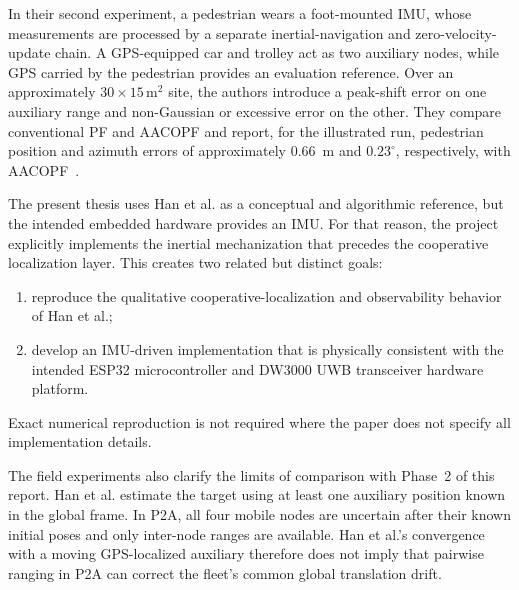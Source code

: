 In their second experiment, a pedestrian wears a foot-mounted IMU, whose measurements are processed by a separate inertial-navigation and zero-velocity-update chain. A GPS-equipped car and trolley act as two auxiliary nodes, while GPS carried by the pedestrian provides an evaluation reference. Over an approximately \(30\times15\,\mathrm{m}^2\) site, the authors introduce a peak-shift error on one auxiliary range and non-Gaussian or excessive error on the other. They compare conventional PF and AACOPF and report, for the illustrated run, pedestrian position and azimuth errors of approximately \SI{0.66}{m} and \(0.23^\circ\), respectively, with AACOPF~\cite{han2020cooperative}.

The present thesis uses Han et al. as a conceptual and algorithmic reference, but the intended embedded hardware provides an IMU. For that reason, the project explicitly implements the inertial mechanization that precedes the cooperative localization layer. This creates two related but distinct goals:
\begin{enumerate}
    \item reproduce the qualitative cooperative-localization and observability behavior of Han et al.;
    \item develop an IMU-driven implementation that is physically consistent with the intended ESP32 microcontroller and DW3000 UWB transceiver hardware platform.
\end{enumerate}
Exact numerical reproduction is not required where the paper does not specify all implementation details.

The field experiments also clarify the limits of comparison with Phase~2 of this report. Han et al. estimate the target using at least one auxiliary position known in the global frame. In P2A, all four mobile nodes are uncertain after their known initial poses and only inter-node ranges are available. Han et al.'s convergence with a moving GPS-localized auxiliary therefore does not imply that pairwise ranging in P2A can correct the fleet's common global translation drift.


